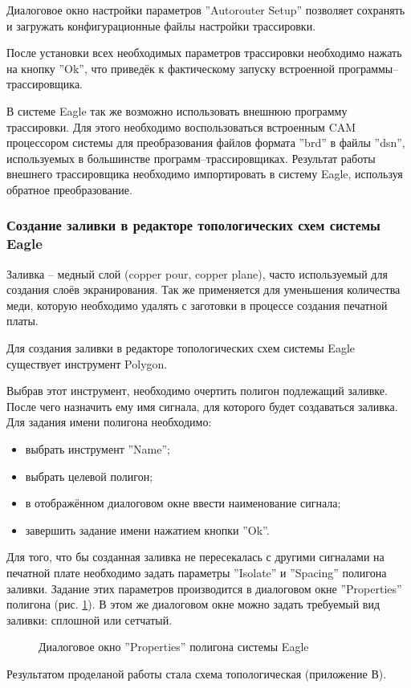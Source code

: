 Диалоговое окно настройки параметров ''Autorouter Setup'' позволяет сохранять и загружать
конфигурационные файлы настройки трассировки.

После установки всех необходимых параметров трассировки необходимо нажать на кнопку
''Ok'', что приведёк к фактическому запуску встроенной программы--трассировщика.

В системе Eagle так же возможно использовать внешнюю программу трассировки.
Для этого необходимо воспользоваться встроенным CAM процессором системы для
преобразования файлов формата ''brd'' в файлы ''dsn'', используемых в большинстве
программ--трассировщиках. Результат работы внешнего трассировщика необходимо
импортировать в систему Eagle, используя обратное преобразование.

\subsubsection{Создание заливки в редакторе топологических схем системы Eagle}
Заливка -- медный слой (copper pour, copper plane), часто используемый для создания
слоёв экранирования. Так же применяется для уменьшения количества меди, которую
необходимо удалять с заготовки в процессе создания печатной платы.

Для создания заливки в редакторе топологических схем системы Eagle существует
инструмент Polygon.

Выбрав этот инструмент, необходимо очертить полигон подлежащий заливке. После чего
назначить ему имя сигнала, для которого будет создаваться заливка. Для задания имени
полигона необходимо:
\begin{itemize}
	\item{} выбрать инструмент ''Name'';
	\item{} выбрать целевой полигон;
	\item{} в отображённом диалоговом окне ввести наименование сигнала;
	\item{} завершить задание имени нажатием кнопки ''Ok''.
\end{itemize}
Для того, что бы созданная заливка не пересекалась с другими сигналами на печатной
плате необходимо задать параметры ''Isolate'' и ''Spacing'' полигона заливки. Задание
этих параметров производится в диалоговом окне ''Properties''
полигона (рис. \ref{img:polyProperty}). В этом же диалоговом окне можно задать требуемый вид
заливки: сплошной или сетчатый.
\begin{figure}[h]
	\caption{Диалоговое окно ''Properties'' полигона системы Eagle}
	\label{img:polyProperty}
\end{figure}


Результатом проделаной работы стала схема топологическая (приложение В).
